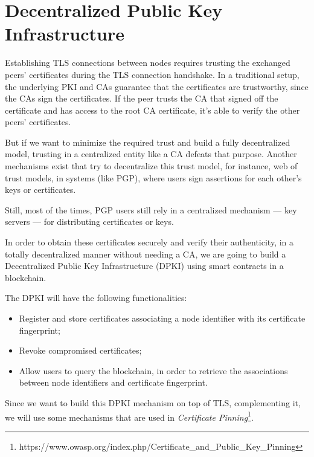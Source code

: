 
\section{Decentralized Public Key Infrastructure} \label{ssec:blockchain}

Establishing \ac{TLS} connections between nodes requires trusting the exchanged peers' certificates during the \ac{TLS} connection handshake.
In a traditional setup, the underlying \ac{PKI} and \acp{CA} guarantee that the certificates are trustworthy, since the \acp{CA} sign the certificates.
If the peer trusts the \ac{CA} that signed off the certificate and has access to the root \ac{CA} certificate, it's able to verify the other peers' certificates.

But if we want to minimize the required trust and build a fully decentralized model, trusting in a centralized entity like a \ac{CA} defeats that purpose.
Another mechanisms exist that try to decentralize this trust model, for instance, web of trust models, in systems (like \ac{PGP}), where users sign assertions for each other's keys or certificates.

Still, most of the times, \ac{PGP} users still rely in a centralized mechanism — key servers — for distributing certificates or keys.

In order to obtain these certificates securely and verify their authenticity, in a totally decentralized manner without needing a CA, we are going to build a Decentralized Public Key Infrastructure (DPKI) using smart contracts in a blockchain.

The DPKI will have the following functionalities:
\begin{itemize}
	\item Register and store certificates associating a node identifier with its certificate fingerprint;
	\item Revoke compromised certificates;
	\item Allow users to query the blockchain, in order to retrieve the associations between node identifiers and certificate fingerprint.
\end{itemize}

Since we want to build this DPKI mechanism on top of TLS, complementing it, we will use some mechanisms that are used in \textit{Certificate Pinning}\footnote{https://www.owasp.org/index.php/Certificate\_and\_Public\_Key\_Pinning}.

